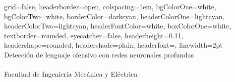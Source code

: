 \documentclass[a0paper,portrait]{baposter}
\begin{document}

\begin{poster}
{
grid=false,
headerborder=open, %
colspacing=1em, %
bgColorOne=white, %
bgColorTwo=white, %
borderColor=darkcyan, %
headerColorOne=lightcyan, %
headerColorTwo=lightcyan, %
headerFontColor=white, %
boxColorOne=white, %
textborder=rounded, %
eyecatcher=false, %
headerheight=0.11\textheight, %
headershape=rounded, %
headershade=plain,
headerfont=\Large\textsf, %
linewidth=2pt %
}
{}
%
%
{
\textsf{Detección de lenguaje ofensivo con redes neuronales profundas} %
} %
{
\sf\vspace{0.3em}\\
\vspace{0.1em}\\
\small{Facultad de Ingeniería Mecánica y Eléctrica
\vspace{0.2em}\\
}}
\end{poster}
\end{document}
